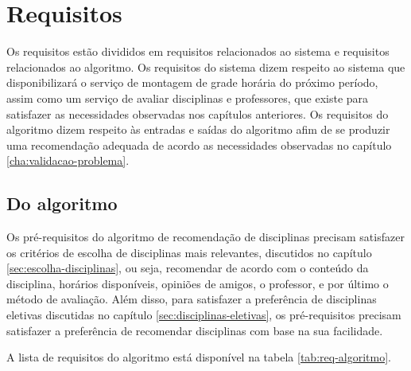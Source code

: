 
\chapter{Requisitos}
\label{cha:Requisitos}

Os requisitos estão divididos em requisitos relacionados ao sistema e requisitos relacionados ao algoritmo.
Os requisitos do sistema dizem respeito ao sistema que disponibilizará o serviço de montagem de grade horária do próximo período, assim como um serviço de avaliar disciplinas e professores, que existe para satisfazer as necessidades observadas nos capítulos anteriores. Os requisitos do algoritmo dizem respeito às entradas e saídas do algoritmo afim de se produzir uma recomendação adequada de acordo as necessidades observadas no capítulo \ref{cha:validacao-problema}.

\section{Do algoritmo}

Os pré-requisitos do algoritmo de recomendação de disciplinas precisam satisfazer os critérios de escolha de disciplinas mais relevantes, discutidos no capítulo \ref{sec:escolha-disciplinas}, ou seja, recomendar de acordo com o conteúdo da disciplina, horários disponíveis, opiniões de amigos, o professor, e por último o método de avaliação.
Além disso, para satisfazer a preferência de disciplinas eletivas discutidas no capítulo \ref{sec:disciplinas-eletivas}, os pré-requisitos precisam satisfazer a preferência de recomendar disciplinas com base na sua facilidade.

A lista de requisitos do algoritmo está disponível na tabela \ref{tab:req-algoritmo}.

